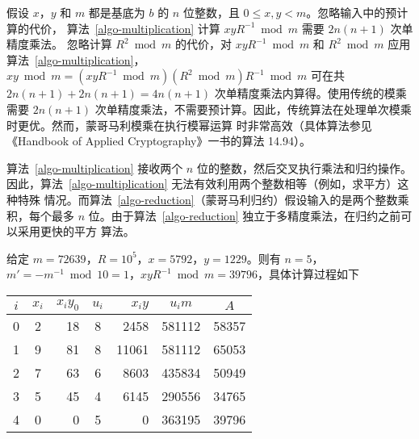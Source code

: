 \begin{note}
  假设 \(x\)，\(y\) 和 \(m\) 都是基底为 \(b\) 的 \(n\) 位整数，且 \(0\le x,y<m\)。忽略输入中的预计算的代价，
  算法~\ref{algo-multiplication} 计算 \(xyR^{-1}\bmod m\) 需要 \(2n(n+1)\) 次单精度乘法。
  忽略计算 \(R^2\bmod m\) 的代价，对 \(xyR^{-1}\bmod m\) 和 \(R^2\bmod m\) 应用算法~\ref{algo-multiplication}，\(xy\bmod m=(xyR^{-1}\bmod m)(R^2\bmod m)R^{-1} \bmod m\) 
  可在共 \(2n(n+1) + 2n(n+1)=4n(n+1)\) 次单精度乘法内算得。使用传统的模乘需要 \(2n(n+1)\)
  次单精度乘法，不需要预计算。因此，传统算法在处理单次模乘时更优。然而，蒙哥马利模乘在执行模幂运算
  时非常高效（具体算法参见《Handbook of Applied Cryptography》一书的算法 14.94）。
\end{note}

\begin{note}[蒙哥马利归约和蒙哥马利乘法]
  算法~\ref{algo-multiplication} 接收两个 \(n\) 位的整数，然后交叉执行乘法和归约操作。
  因此，算法~\ref{algo-multiplication} 无法有效利用两个整数相等（例如，求平方）这种特殊
  情况。而算法~\ref{algo-reduction}（蒙哥马利归约）假设输入的是两个整数乘积，每个最多
  \(n\) 位。由于算法~\ref{algo-reduction} 独立于多精度乘法，在归约之前可以采用更快的平方
  算法。
\end{note}

\begin{example}[蒙哥马利乘法]
  给定 \(m=72639\)，\(R=10^5\)，\(x=5792\)，\(y=1229\)。则有 \(n=5\)，
  \(m'=-m^{-1}\bmod 10 =1\)，\(xyR^{-1}\bmod m=39796\)，具体计算过程如下

  \begin{table}[!htbp]
    \centering
    \begin{tabular}{|c|c|r|c|r|c|c|}
      \hline
      \(i\) &\(x_i\) &\(x_i y_0\) &\(u_i\) &\(x_i y\) &\(u_i m\) &\(A\) \\
      \hline
      0 &2 &18 &8 &2458  &581112 &58357 \\
      1 &9 &81 &8 &11061 &581112 &65053 \\
      2 &7 &63 &6 &8603  &435834 &50949 \\
      3 &5 &45 &4 &6145  &290556 &34765 \\
      4 &0 &0  &5 &0     &363195 &39796 \\
      \hline
    \end{tabular} 
  \end{table}
\end{example}
